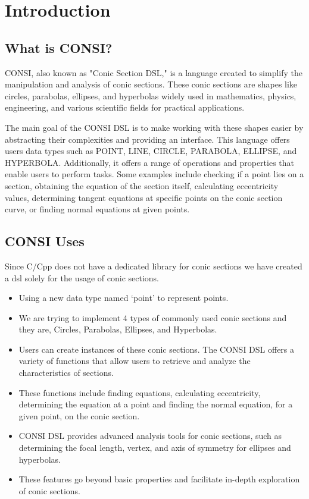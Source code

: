 \documentclass[12pt]{fphw}
\begin{document}
\tableofcontents

\section{Introduction}

\subsection{What is CONSI?}
CONSI, also known as "Conic Section DSL," is a language created to simplify the manipulation and analysis of conic sections. These conic sections are shapes like circles, parabolas, ellipses, and hyperbolas widely used in mathematics, physics, engineering, and various scientific fields for practical applications.

The main goal of the CONSI DSL is to make working with these shapes easier by abstracting their complexities and providing an interface. This language offers users data types such as POINT, LINE, CIRCLE, PARABOLA, ELLIPSE, and HYPERBOLA. Additionally, it offers a range of operations and properties that enable users to perform tasks. Some examples include checking if a point lies on a section, obtaining the equation of the section itself, calculating eccentricity values, determining tangent equations at specific points on the conic section curve, or finding normal equations at given points.

\subsection{CONSI Uses}
Since C/Cpp does not have a dedicated library for conic sections we have created a dsl solely for the usage of conic sections. 
\begin{itemize}
    \item Using a new data type named ‘point’ to represent points. 
    \item We are trying to implement 4 types of commonly used conic sections and they are, Circles, Parabolas, Ellipses, and Hyperbolas. 
    \item Users can create instances of these conic sections.
The CONSI DSL offers a variety of functions that allow users to retrieve and analyze the characteristics of sections. 
\item These functions include finding equations, calculating eccentricity, determining the equation at a point and finding the normal equation, for a given point, on the conic section.
\item CONSI DSL provides advanced analysis tools for conic sections, such as determining the focal length, vertex, and axis of symmetry for ellipses and hyperbolas.
\item These features go beyond basic properties and facilitate in-depth exploration of conic sections.
\end{itemize}
\end{document}
